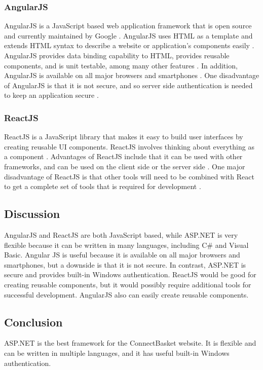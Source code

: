 \documentclass[onecolumn, draftclsnofoot,10pt, compsoc]{IEEEtran}
\begin{document}
\subsubsection{AngularJS}
AngularJS is a JavaScript based web application framework that is open source and currently maintained by Google \cite{angular}. AngularJS uses HTML as a template and extends HTML syntax to describe a website or application's components easily \cite{angular}. AngularJS provides data binding capability to HTML, provides reusable components, and is unit testable, among many other features \cite{angular}. In addition, AngularJS is available on all major browsers and smartphones \cite{angular}. One disadvantage of AngularJS is that it is not secure, and so server side authentication is needed to keep an application secure \cite{angular}.

\subsubsection{ReactJS}
ReactJS is a JavaScript library that makes it easy to build user interfaces by creating reusable UI components\cite{react}. ReactJS involves thinking about everything as a component \cite{react}. Advantages of ReactJS include that it can be used with other frameworks, and can be used on the client side or the server side \cite{react}. One major disadvantage of ReactJS is that other tools will need to be combined with React to get a complete set of tools that is required for development \cite{react}. 

\subsection{Discussion}
AngularJS and ReactJS are both JavaScript based, while ASP.NET is very flexible because it can be written in many languages, including C\# and Visual Basic. Angular JS is useful because it is available on all major browsers and smartphones, but a downside is that it is not secure. In contrast, ASP.NET is secure and provides built-in Windows authentication. ReactJS would be good for creating reusable components, but it would possibly require additional tools for successful development. AngularJS also can easily create reusable components.

\subsection{Conclusion}
ASP.NET is the best framework for the ConnectBasket website. It is flexible and can be written in multiple languages, and it has useful built-in Windows authentication. 
\end{document}
